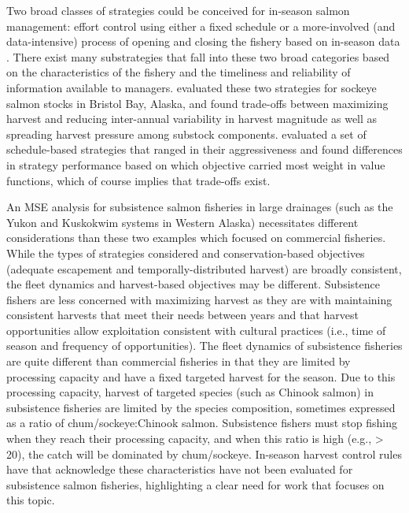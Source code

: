 \documentclass[12pt,]{book}
\theoremstyle{definition}
\theoremstyle{definition}
\theoremstyle{definition}
\theoremstyle{remark}
\begin{document}
Two broad classes of strategies could be conceived for in-season salmon
management: effort control using either a fixed schedule or a
more-involved (and data-intensive) process of opening and closing the
fishery based on in-season data \citep[i.e., management by emergency
order,][]{adkison-cunningham-2015}. There exist many substrategies that
fall into these two broad categories based on the characteristics of the
fishery and the timeliness and reliability of information available to
managers. \citet{carney-adkison-2014} evaluated these two strategies for
sockeye salmon stocks in Bristol Bay, Alaska, and found trade-offs
between maximizing harvest and reducing inter-annual variability in
harvest magnitude as well as spreading harvest pressure among substock
components. \citet{su-adkison-2002} evaluated a set of schedule-based
strategies that ranged in their aggressiveness and found differences in
strategy performance based on which objective carried most weight in
value functions, which of course implies that trade-offs exist.

An MSE analysis for subsistence salmon fisheries in large drainages
(such as the Yukon and Kuskokwim systems in Western Alaska) necessitates
different considerations than these two examples which focused on
commercial fisheries. While the types of strategies considered and
conservation-based objectives (adequate escapement and
temporally-distributed harvest) are broadly consistent, the fleet
dynamics and harvest-based objectives may be different. Subsistence
fishers are less concerned with maximizing harvest as they are with
maintaining consistent harvests that meet their needs between years and
that harvest opportunities allow exploitation consistent with cultural
practices (i.e., time of season and frequency of opportunities). The
fleet dynamics of subsistence fisheries are quite different than
commercial fisheries in that they are limited by processing capacity and
have a fixed targeted harvest for the season. Due to this processing
capacity, harvest of targeted species (such as Chinook salmon) in
subsistence fisheries are limited by the species composition, sometimes
expressed as a ratio of chum/sockeye:Chinook salmon. Subsistence fishers
must stop fishing when they reach their processing capacity, and when
this ratio is high (e.g., \textgreater{} 20), the catch will be
dominated by chum/sockeye. In-season harvest control rules have that
acknowledge these characteristics have not been evaluated for
subsistence salmon fisheries, highlighting a clear need for work that
focuses on this topic.
\end{document}
